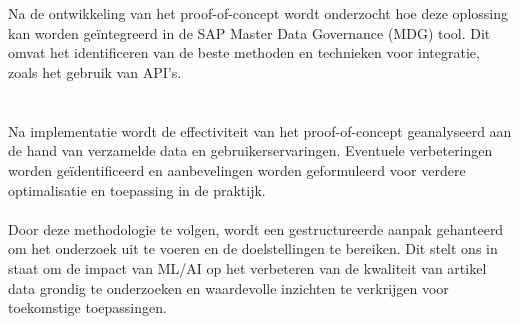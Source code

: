 \section{}%
\label{sec:IntegratieM}
Na de ontwikkeling van het proof-of-concept wordt onderzocht hoe deze oplossing kan worden geïntegreerd in de SAP Master Data Governance (MDG) tool. Dit omvat het identificeren van de beste methoden en technieken voor integratie, zoals het gebruik van API's.

\section{}%
\label{sec:ConclusieM}
Na implementatie wordt de effectiviteit van het proof-of-concept geanalyseerd aan de hand van verzamelde data en gebruikerservaringen. Eventuele verbeteringen worden geïdentificeerd en aanbevelingen worden geformuleerd voor verdere optimalisatie en toepassing in de praktijk.
\\ \\
Door deze methodologie te volgen, wordt een gestructureerde aanpak gehanteerd om het onderzoek uit te voeren en de doelstellingen te bereiken. Dit stelt ons in staat om de impact van ML/AI op het verbeteren van de kwaliteit van artikel data grondig te onderzoeken en waardevolle inzichten te verkrijgen voor toekomstige toepassingen.